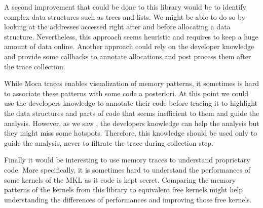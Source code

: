 A second improvement that could be done to this library would be to identify complex data structures such as trees and lists.
We might be able to do so by looking at the addresses accessed right after and before allocating a data structure.
Nevertheless, this approach seems heuristic and requires to keep a huge amount of data online.
Another approach could rely on the developer knowledge and provide some callbacks to annotate allocations and post process them after the trace collection.

While \gls{Moca} traces enables visualization of memory patterns, it sometimes is hard to associate these patterns with some code a posteriori.
At this point we could use the developers knowledge to annotate their code before tracing it to highlight the data structures and parts of code that seems inefficient to them and guide the analysis.
However, as we saw , the developers knowledge can help the analysis but they might miss some hotspots.
Therefore, this knowledge should be used only to guide the analysis, never to filtrate the trace during collection step.

Finally it would be interesting to use memory traces to understand proprietary code.
More specifically, it is sometimes hard to understand the performances of some kernels of the \gls{MKL} as it code is kept secret.
Comparing the memory patterns of the kernels from this library to equivalent free kernels might help understanding the differences of performances and improving those free kernels.
